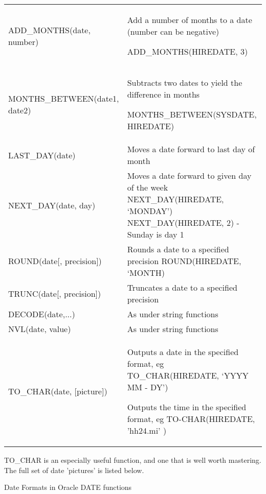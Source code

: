 \begin{flushleft}
\tablefirsthead{}
\tablehead{}
\tabletail{}
\tablelasttail{}
\begin{supertabular}{m{6.743cm}m{8.799cm}}
ADD\_MONTHS(date, number)  &
Add a number of months to a date (number can be negative)

ADD\_MONTHS(HIREDATE, 3)\\
MONTHS\_BETWEEN(date1, date2) &
Subtracts two dates to yield the difference in months

MONTHS\_BETWEEN(SYSDATE, HIREDATE)\\
LAST\_DAY(date) &
Moves a date forward to last day of month\\
NEXT\_DAY(date, day) &
Moves a date forward to given day of the week  NEXT\_DAY(HIREDATE, `MONDAY') NEXT\_DAY(HIREDATE, 2) - Sunday is day 1\\
ROUND(date[, precision]) &
Rounds a date to a specified precision ROUND(HIREDATE, `MONTH)\\
TRUNC(date[, precision]) &
Truncates a date to a specified precision\\
DECODE(date,...) &
As under string functions\\
NVL(date, value) &
As under string functions\\
TO\_CHAR(date, [picture]) &
Outputs a date in the specified format, eg TO\_CHAR(HIREDATE, `YYYY  MM - DY')

Outputs the time in the specified format, eg TO-CHAR(HIREDATE, 'hh24.mi' )\\
\end{supertabular}
\end{flushleft}
TO\_CHAR is an especially useful function, and one that is well worth mastering.  The full set of date 'pictures' is listed below.

Date Formats in Oracle DATE functions

